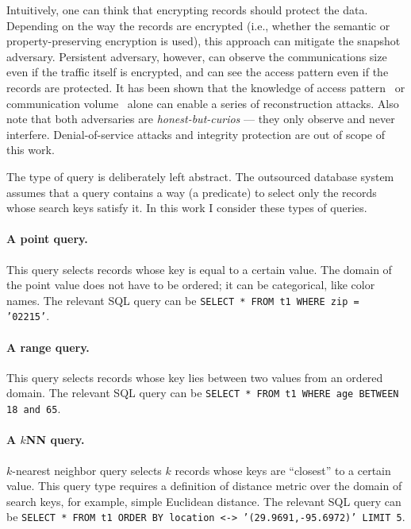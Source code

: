 		Intuitively, one can think that encrypting records should protect the data.
		Depending on the way the records are encrypted (i.e., whether the semantic or property-preserving encryption is used), this approach can mitigate the snapshot adversary.
		Persistent adversary, however, can observe the communications size even if the traffic itself is encrypted, and can see the access pattern even if the records are protected.
		It has been shown that the knowledge of access pattern~\cite{multidimensional-range-queries, inference-attack-islam-14, leakage-abuse-attacks-cash-15, inference-attacks-naveed-15, generic-attacks-kellaris, attacks-tao-of-inference, grubbs-attacks, access-pattern-disclosure, attacks-improved-reconstruction} or communication volume~\cite{generic-attacks-kellaris, state-of-uniform, attacks-improved-reconstruction, pump-volume-attacks, volume-range-attacks} alone can enable a series of reconstruction attacks.
		Also note that both adversaries are \emph{honest-but-curios} --- they only observe and never interfere.
		Denial-of-service attacks and integrity protection are out of scope of this work.

		The type of query \query{} is deliberately left abstract.
		The outsourced database system assumes that a query contains a way (a predicate) to select only the records whose search keys satisfy it.
		In this work I consider these types of queries.

		\paragraph*{A point query.}
			This query selects records whose key is equal to a certain value.
			The domain of the point value does not have to be ordered; it can be categorical, like color names.
			The relevant SQL query can be \texttt{SELECT * FROM t1 WHERE zip = '02215'}.

		\paragraph*{A range query.}
			This query selects records whose key lies between two values from an ordered domain.
			The relevant SQL query can be \texttt{SELECT * FROM t1 WHERE age BETWEEN 18 and 65}.

		\paragraph*{A $k$NN query.}
			$k$-nearest neighbor query selects $k$ records whose keys are ``closest'' to a certain value.
			This query type requires a definition of distance metric over the domain of search keys, for example, simple Euclidean distance.
			The relevant SQL query can be \texttt{SELECT * FROM t1 ORDER BY location <-> '(29.9691,-95.6972)' LIMIT 5}. %

